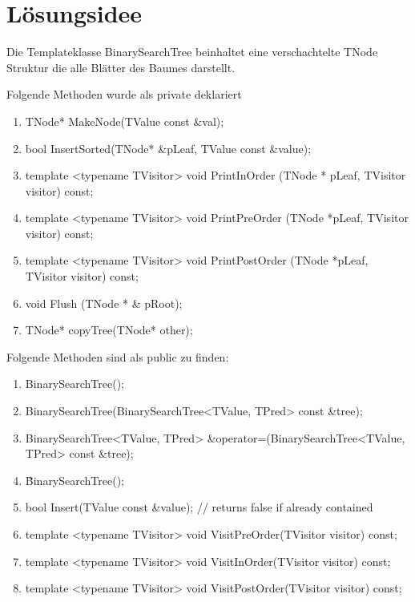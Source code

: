 \documentclass[a4paper,oneside,openany]{tufte-book}
\begin{document}
\section{L\"{o}sungsidee}

Die Templateklasse BinarySearchTree beinhaltet eine verschachtelte TNode Struktur die alle Blätter des Baumes darstellt.

Folgende Methoden wurde als private deklariert
\begin{fullwidth}
\begin{enumerate}
	\item TNode* MakeNode(TValue const \&val);\label{enum:MakeNode}
	\item bool InsertSorted(TNode* \&pLeaf, TValue const \&value);\label{enum:InsertSorted}
	\item template <typename TVisitor> void PrintInOrder (TNode * pLeaf, TVisitor visitor) const;\label{enum:PrintInOrder}
	\item template <typename TVisitor> void PrintPreOrder (TNode *pLeaf, TVisitor visitor) const;\label{enum:PrintPreOrder}
	\item template <typename TVisitor> void PrintPostOrder (TNode *pLeaf, TVisitor visitor) const;\label{enum:PrintPostOrder}
	\item void Flush (TNode * \& pRoot);\label{enum:Flush}
	\item TNode* copyTree(TNode* other);\label{enum:copyTree}
\end{enumerate}

Folgende Methoden sind als public zu finden:

\begin{enumerate}[resume]
	\item BinarySearchTree();\label{enum:Ctor}
	\item BinarySearchTree(BinarySearchTree<TValue, TPred> const \&tree);\label{enum:CopyCtor}
	\item BinarySearchTree<TValue, TPred> \&operator=(BinarySearchTree<TValue, TPred> const \&tree);\label{enum:Assign}
	\item \~BinarySearchTree();\label{enum:Dtor}
	\item bool Insert(TValue const \&value); // returns false if already contained\label{enum:Insert}
	\item template <typename TVisitor> void VisitPreOrder(TVisitor visitor) const;\label{enum:VisitPre}
	\item template <typename TVisitor> void VisitInOrder(TVisitor visitor) const;\label{enum:VisitIn}
	\item template <typename TVisitor> void VisitPostOrder(TVisitor visitor) const;\label{enum:VisitPost}
\end{enumerate}
\end{fullwidth}
\end{document}
